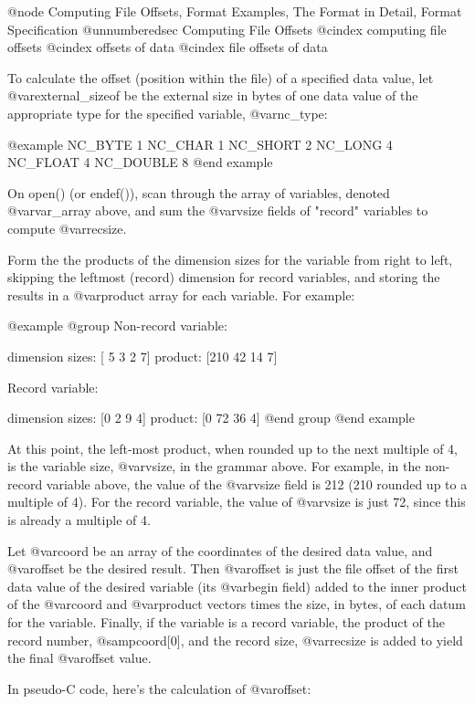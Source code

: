 {@node Computing File Offsets, Format Examples, The Format in Detail, Format Specification
@unnumberedsec Computing File Offsets
@cindex computing file offsets
@cindex offsets of data
@cindex file offsets of data

To calculate the offset (position within the file) of a specified data
value, let @var{external_sizeof} be the external size in bytes of one
data value of the appropriate type for the specified variable, @var{nc_type}:

@example
NC_BYTE         1
NC_CHAR         1
NC_SHORT        2
NC_LONG         4
NC_FLOAT        4
NC_DOUBLE       8
@end example

On open() (or endef()), scan through the array of variables, denoted
@var{var_array} above, and sum the @var{vsize} fields of "record"
variables to compute @var{recsize}.

Form the the products of the dimension sizes for the variable from right
to left, skipping the leftmost (record) dimension for record variables,
and storing the results in a @var{product} array for each variable.
For example:

@example
@group
Non-record variable:

        dimension sizes:        [  5  3  2 7]
        product:                [210 42 14 7]

Record variable:

        dimension sizes:        [0  2  9 4]
        product:                [0 72 36 4]
@end group
@end example

At this point, the left-most product, when rounded up to the next
multiple of 4, is the variable size, @var{vsize}, in the grammar above.
For example, in the non-record variable above, the value of the
@var{vsize} field is 212 (210 rounded up to a multiple of 4).  For the
record variable, the value of @var{vsize} is just 72, since this is
already a multiple of 4.

Let @var{coord} be an array of the coordinates of the desired data
value, and @var{offset} be the desired result.  Then @var{offset} is
just the file offset of the first data value of the desired variable
(its @var{begin} field) added to the inner product of the @var{coord}
and @var{product} vectors times the size, in bytes, of each datum for
the variable.  Finally, if the variable is a record variable, the
product of the record number, @samp{coord[0]}, and the record size,
@var{recsize} is added to yield the final @var{offset} value.

In pseudo-C code, here's the calculation of @var{offset}:

}
